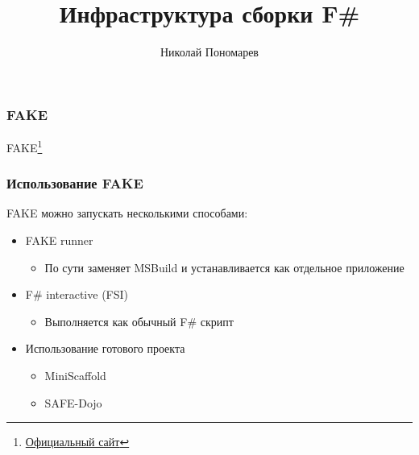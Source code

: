 \documentclass[aspectratio=169]{beamer}
\title{Инфраструктура сборки F\#}
\author{Николай Пономарев}
\date{}
\begin{document}
\begin{frame}
    \titlepage
\end{frame}

\begin{frame}
    \frametitle{FAKE}

    FAKE\footnote{\href{https://fake.build/index.html}{Официальный сайт}}~%
\end{frame}

\begin{frame}
    \frametitle{Использование FAKE}
    FAKE можно запускать несколькими способами:
    \begin{itemize}
        \item FAKE runner
              \begin{itemize}
                  \item По сути заменяет MSBuild и устанавливается как отдельное приложение
              \end{itemize}
        \item F\# interactive (FSI)
              \begin{itemize}
                  \item Выполняется как обычный F\# скрипт
              \end{itemize}
        \item Использование готового проекта
              \begin{itemize}
                  \item MiniScaffold
                  \item SAFE-Dojo
              \end{itemize}
    \end{itemize}
\end{frame}
\end{document}

